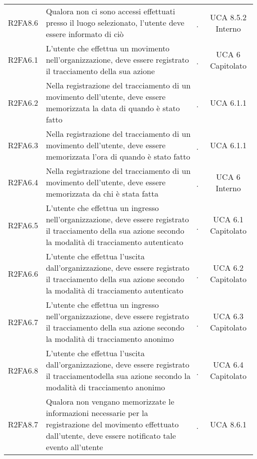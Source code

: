 {\begin{longtable}{ c C{8cm} c c}
R2FA8.6 & Qualora non ci sono accessi effettuati presso il luogo selezionato, l'utente deve essere informato di ciò & \d & UCA 8.5.2 Interno \\

R2FA6.1 & L’utente che effettua un movimento nell’organizzazione, deve essere registrato il tracciamento della sua azione & \d & UCA 6 Capitolato \\

R2FA6.2 & Nella registrazione del tracciamento di un movimento dell’utente, deve essere memorizzata la data di quando è stato fatto & \d & UCA 6.1.1 \\

R2FA6.3 & Nella registrazione del tracciamento di un movimento dell’utente, deve essere memorizzata l’ora di quando è stato fatto & \d & UCA 6.1.1 \\

R2FA6.4 & Nella registrazione del tracciamento di un movimento dell’utente, deve essere memorizzata da chi è stata fatta & \d & UCA 6 Interno \\

R2FA6.5 & L’utente che effettua un ingresso nell’organizzazione, deve essere registrato il tracciamento della sua azione secondo la modalità di tracciamento autenticato & \d & UCA 6.1 Capitolato \\

R2FA6.6 & L’utente che effettua l’uscita dall’organizzazione, deve essere registrato il tracciamento della sua azione secondo la modalità di tracciamento autenticato & \d & UCA 6.2 Capitolato \\

R2FA6.7 & L’utente che effettua un ingresso nell’organizzazione, deve essere registrato il tracciamento della sua azione secondo la modalità di tracciamento anonimo & \d & UCA 6.3 Capitolato \\

R2FA6.8 & L’utente che effettua l’uscita dall’organizzazione, deve essere registrato il tracciamentodella sua azione secondo la modalità di tracciamento anonimo & \d & UCA 6.4 Capitolato \\

R2FA8.7 & Qualora non vengano memorizzate le informazioni necessarie per la registrazione del movimento effettuato dall’utente, deve essere notificato tale evento all’utente & \d & UCA 8.6.1 \\


\end{longtable}}
